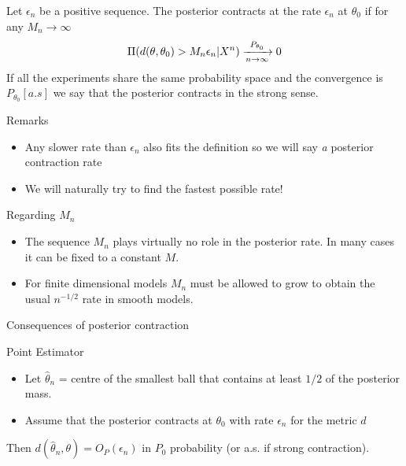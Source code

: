 \begin{definition}
Let $\epsilon_n$ be a positive sequence. The posterior contracts at the rate $\epsilon_n$ at $\theta_0$ if for any $M_n \to \infty$ 
$$
\Pi(d(\theta,\theta_0)> M_n \epsilon_n|X^n) \xrightarrow[n \to \infty]{P_{\theta_0}} 0 
$$
If all the experiments share the same probability space and the convergence is $P_{\theta_0}[a.s]$ we say that the posterior contracts in the strong sense.
\end{definition}








{Remarks}

\begin{itemize}
\item Any slower rate than $\epsilon_n$ also fits the definition so we will say \emph{a} posterior contraction rate
\item We will naturally try to find the fastest possible rate! 
\end{itemize}
 
\begin{block}{Regarding $M_n$}
\begin{itemize}
\item The sequence $M_n$ plays	 virtually no role in the posterior rate. In many cases it can be fixed to a constant $M$. 
\item For finite dimensional models $M_n$ must be allowed to grow to obtain the usual $n^{-1/2}$ rate in smooth models. 
\end{itemize}

\end{block}









{Consequences of posterior contraction}
\begin{block}{Point Estimator}
\begin{itemize}
\item Let $\hat{\theta}_n$ = centre of the smallest ball that contains at least $1/2$ of the posterior mass. 
\item Assume that the posterior contracts at $\theta_0$ with rate $\epsilon_n$ for the metric $d$
\end{itemize}

Then $d(\hat{\theta}_n,\theta) = O_P(\epsilon_n)$ in $P_0$ probability (or a.s. if strong contraction).
\end{block}






